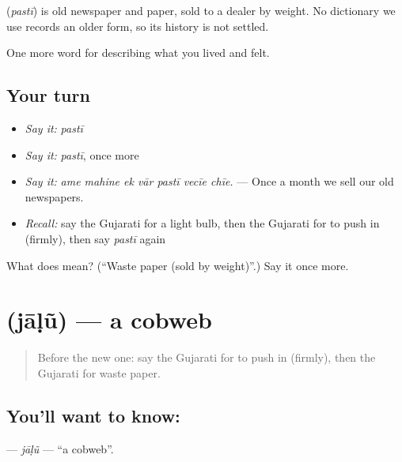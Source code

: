 \begin{cousinweb}
\textbf{} (\emph{pastī}) is old newspaper and paper, sold to a dealer by weight. No dictionary we use records an older form, so its history is not settled.
\end{cousinweb}

\begin{grammarlens}[title={What you've built}]
One more word for describing what you lived and felt.
\end{grammarlens}

\subsection*{Your turn}
\begin{itemize}
\raggedright
  \item \emph{Say it:} \emph{pastī}
  \item \emph{Say it:} \emph{pastī}, once more
  \item \emph{Say it:} \emph{ame mahine ek vār pastī vecīe chīe.} — Once a month we sell our old newspapers.
  \item \emph{Recall:} say the Gujarati for a light bulb, then the Gujarati for to push in (firmly), then say \emph{pastī} again
\end{itemize}

\begin{tcolorbox}[breakable,colback=teal!4,colframe=teal!35!black,title={Before you move on}]
What does  mean? (\textquotedblleft{}Waste paper (sold by weight)\textquotedblright{}.) Say it once more.
\end{tcolorbox}
\section[\texorpdfstring{\gu{જાળું} (jāḷũ)}{જાળું (jāḷũ)}]{ (jāḷũ) — a cobweb}

\label{lesson:GU-C518-jalu}



\begin{quote}
Before the new one: say the Gujarati for to push in (firmly), then the Gujarati for waste paper.
\end{quote}

\subsection*{You'll want to know: }
\textbf{} — \emph{jāḷũ} — \textquotedblleft{}a cobweb\textquotedblright{}.

